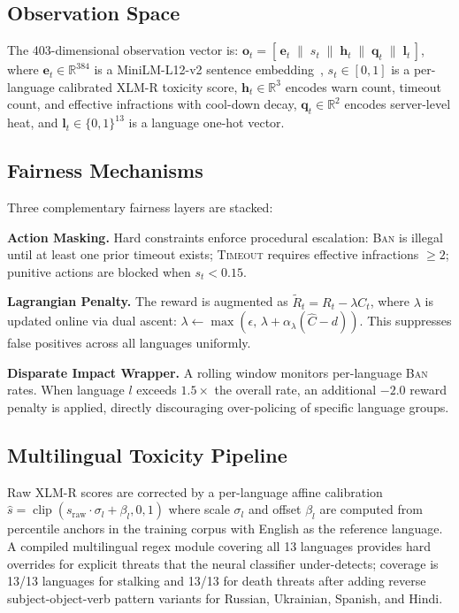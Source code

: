 \documentclass[journal]{IEEEtran}
\begin{document}
\subsection{Observation Space}

The 403-dimensional observation vector is:
$\mathbf{o}_t = [\,\mathbf{e}_t \;\|\; s_t \;\|\; \mathbf{h}_t \;\|\;
\mathbf{q}_t \;\|\; \mathbf{l}_t\,]$,
where $\mathbf{e}_t \in \mathbb{R}^{384}$ is a MiniLM-L12-v2 sentence
embedding~\cite{reimers2019}, $s_t \in [0,1]$ is a per-language calibrated
XLM-R toxicity score, $\mathbf{h}_t \in \mathbb{R}^3$ encodes warn count,
timeout count, and effective infractions with cool-down decay,
$\mathbf{q}_t \in \mathbb{R}^2$ encodes server-level heat, and
$\mathbf{l}_t \in \{0,1\}^{13}$ is a language one-hot vector.

\subsection{Fairness Mechanisms}

Three complementary fairness layers are stacked:

\textbf{Action Masking.}
Hard constraints enforce procedural escalation: \textsc{Ban} is illegal until
at least one prior timeout exists; \textsc{Timeout} requires effective
infractions $\geq 2$; punitive actions are blocked when $s_t < 0.15$.

\textbf{Lagrangian Penalty.}
The reward is augmented as $\tilde{R}_t = R_t - \lambda C_t$, where $\lambda$
is updated online via dual ascent: $\lambda \leftarrow \max(\epsilon,\,
\lambda + \alpha_\lambda(\hat{C} - d))$.
This suppresses false positives across all languages uniformly.

\textbf{Disparate Impact Wrapper.}
A rolling window monitors per-language \textsc{Ban} rates. When language $l$
exceeds $1.5\times$ the overall rate, an additional $-2.0$ reward penalty is
applied, directly discouraging over-policing of specific language groups.

\subsection{Multilingual Toxicity Pipeline}

Raw XLM-R scores are corrected by a per-language affine calibration
$\hat{s} = \operatorname{clip}(s_{\text{raw}} \cdot \sigma_l + \beta_l, 0, 1)$
where scale $\sigma_l$ and offset $\beta_l$ are computed from percentile anchors
in the training corpus with English as the reference language. A compiled
multilingual regex module covering all 13 languages provides hard overrides for
explicit threats that the neural classifier under-detects; coverage is 13/13
languages for stalking and 13/13 for death threats after adding reverse
subject-object-verb pattern variants for Russian, Ukrainian, Spanish, and Hindi.
\end{document}
